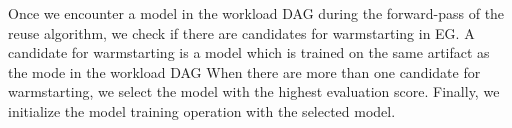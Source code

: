 Once we encounter a model in the workload DAG during the forward-pass of the reuse algorithm, we check if there are candidates for warmstarting in EG.
A candidate for warmstarting is a model which is trained on the same artifact as the mode in the workload DAG
When there are more than one candidate for warmstarting, we select the model with the highest evaluation score.
Finally, we initialize the model training operation with the selected model.
%
